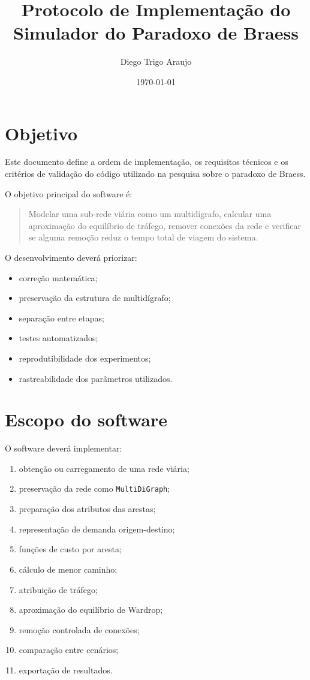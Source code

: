 \documentclass[12pt,a4paper]{article}
\title{Protocolo de Implementação do Simulador do Paradoxo de Braess}
\author{Diego Trigo Araujo}
\date{\today}
\begin{document}
\maketitle

\section{Objetivo}

Este documento define a ordem de implementação, os requisitos técnicos e os
critérios de validação do código utilizado na pesquisa sobre o paradoxo de
Braess.

O objetivo principal do software é:

\begin{quote}
Modelar uma sub-rede viária como um multidígrafo, calcular uma aproximação do
equilíbrio de tráfego, remover conexões da rede e verificar se alguma remoção
reduz o tempo total de viagem do sistema.
\end{quote}

O desenvolvimento deverá priorizar:

\begin{itemize}
    \item correção matemática;
    \item preservação da estrutura de multidígrafo;
    \item separação entre etapas;
    \item testes automatizados;
    \item reprodutibilidade dos experimentos;
    \item rastreabilidade dos parâmetros utilizados.
\end{itemize}

\section{Escopo do software}

O software deverá implementar:

\begin{enumerate}
    \item obtenção ou carregamento de uma rede viária;
    \item preservação da rede como \texttt{MultiDiGraph};
    \item preparação dos atributos das arestas;
    \item representação de demanda origem-destino;
    \item funções de custo por aresta;
    \item cálculo de menor caminho;
    \item atribuição de tráfego;
    \item aproximação do equilíbrio de Wardrop;
    \item remoção controlada de conexões;
    \item comparação entre cenários;
    \item exportação de resultados.
\end{enumerate}
\end{document}
